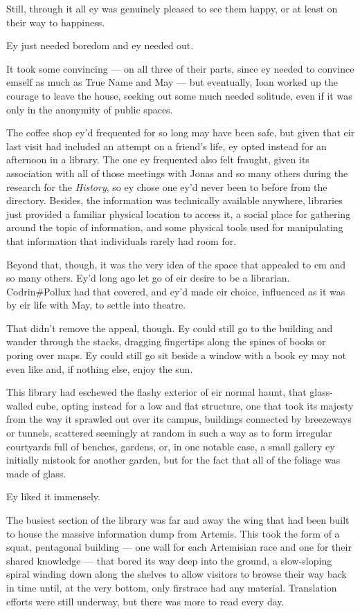 Still, through it all ey was genuinely pleased to see them happy, or at least on their way to happiness.

Ey just needed boredom and ey needed out.

It took some convincing — on all three of their parts, since ey needed to convince emself as much as True Name and May — but eventually, Ioan worked up the courage to leave the house, seeking out some much needed solitude, even if it was only in the anonymity of public spaces.

The coffee shop ey'd frequented for so long may have been safe, but given that eir last visit had included an attempt on a friend's life, ey opted instead for an afternoon in a library. The one ey frequented also felt fraught, given its association with all of those meetings with Jonas and so many others during the research for the \emph{History}, so ey chose one ey'd never been to before from the directory. Besides, the information was technically available anywhere, libraries just provided a familiar physical location to access it, a social place for gathering around the topic of information, and some physical tools used for manipulating that information that individuals rarely had room for.

Beyond that, though, it was the very idea of the space that appealed to em and so many others. Ey'd long ago let go of eir desire to be a librarian. Codrin\#Pollux had that covered, and ey'd made eir choice, influenced as it was by eir life with May, to settle into theatre.

That didn't remove the appeal, though. Ey could still go to the building and wander through the stacks, dragging fingertips along the spines of books or poring over maps. Ey could still go sit beside a window with a book ey may not even like and, if nothing else, enjoy the sun.

This library had eschewed the flashy exterior of eir normal haunt, that glass-walled cube, opting instead for a low and flat structure, one that took its majesty from the way it sprawled out over its campus, buildings connected by breezeways or tunnels, scattered seemingly at random in such a way as to form irregular courtyards full of benches, gardens, or, in one notable case, a small gallery ey initially mistook for another garden, but for the fact that all of the foliage was made of glass.

Ey liked it immensely.

The busiest section of the library was far and away the wing that had been built to house the massive information dump from Artemis. This took the form of a squat, pentagonal building — one wall for each Artemisian race and one for their shared knowledge — that bored its way deep into the ground, a slow-sloping spiral winding down along the shelves to allow visitors to browse their way back in time until, at the very bottom, only firstrace had any material. Translation efforts were still underway, but there was more to read every day.

